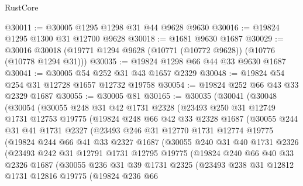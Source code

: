 \begin{lexlean}{RustCore}
\begin{coremodule}
@30011 := @30005 @1295 @1298 @31 @44 @9628 @9630
@30016 := @19824 @1295 @1300 @31 @12700 @9628
@30018 := @1681 @9630 @1687
@30029 := @30016 @30018 (@19771 @1294 @9628 (@10771 (@10772 @9628)) (@10776 (@10778 @1294 @31)))
@30035 := @19824 @1298 @66 @44 @33 @9630 @1687
@30041 := @30005 @54 @252 @31 @43 @1657 @2329
@30048 := @19824 @54 @254 @31 @12728 @1657 @12732 @19758
@30054 := @19824 @252 @66 @43 @33 @2329 @1687
@30055 := @30005 @81
@30165 := @30035
    (@30041
      (@30048
        (@30054
          (@30055
            @248
            @31
            @42
            @1731
            @2328
            (@23493
              @250
              @31
              @12749
              @1731
              @12753
              @19775
              (@19824
                @248
                @66
                @42
                @33
                @2328
                @1687
                (@30055
                  @244
                  @31
                  @41
                  @1731
                  @2327
                  (@23493
                    @246
                    @31
                    @12770
                    @1731
                    @12774
                    @19775
                    (@19824
                      @244
                      @66
                      @41
                      @33
                      @2327
                      @1687
                      (@30055
                        @240
                        @31
                        @40
                        @1731
                        @2326
                        (@23493
                          @242
                          @31
                          @12791
                          @1731
                          @12795
                          @19775
                          (@19824
                            @240
                            @66
                            @40
                            @33
                            @2326
                            @1687
                            (@30055
                              @236
                              @31
                              @39
                              @1731
                              @2325
                              (@23493
                                @238
                                @31
                                @12812
                                @1731
                                @12816
                                @19775
                                (@19824
                                  @236
                                  @66

\end{coremodule}
\end{lexlean}
